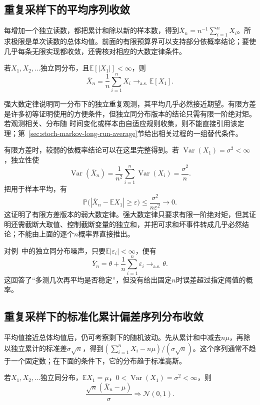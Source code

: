 \subsection{重复采样下的平均序列收敛}

每增加一个独立读数，都把累计和除以新的样本数，得到\(\overline X_n=n^{-1}\sum_{i=1}^nX_i\)。所求极限是单次读数的总体均值。前面的有限预算界可以支持部分依概率结论；要使几乎每条无限实现都收敛，还需核对相应的大数定律条件。
\label{sec:rv-aggregate-limits}
\begin{theorem}[强大数定律]
\label{thm:probability-strong-law-large-numbers}
若\(X_1,X_2,\ldots\)独立同分布，且\(\mathbb{E}[|X_1|]<\infty\)，则
\[ \overline{X}_n
  =\frac{1}{n}\sum_{i=1}^{n}X_i\to_{\mathrm{a.s.}}\mathbb{E}[X_1]. \]
\end{theorem}

强大数定律说明同一分布下的独立重复观测，其平均几乎必然接近期望。有限方差是许多初等证明使用的方便条件，但独立同分布版本的结论只需有限一阶绝对矩。若观测相关、分布随
时间变化或样本由自适应规则收集，则不能直接引用该定理；第~\ref{sec:stoch-markov-long-run-average}节给出相关过程的一组替代条件。

有限方差时，较弱的依概率结论可以在这里完整得到。若
\(\operatorname{Var}(X_1)=\sigma^2<\infty\)，独立性使
\[
  \operatorname{Var}(\overline{X}_n)
  =\frac{1}{n^2}\sum_{i=1}^{n}\operatorname{Var}(X_i)
  =\frac{\sigma^2}{n}.
\]
把用于样本平均，有
\[
  \mathbb{P}\bigl(
    |\overline{X}_n-\mathbb{E}X_1|\geq\varepsilon
  \bigr)
  \leq\frac{\sigma^2}{n\varepsilon^2}\to0.
\]
这证明了有限方差版本的弱大数定律。强大数定律只要求有限一阶绝对矩，但其证明还需截断大取值、控制截断变量的独立和，并把可求和坏事件转成几乎必然结论；不能由上面的逐个\(n\)概率界直接推出。

对例~中的独立同分布噪声，只要\(\mathbb{E}|\varepsilon_i|<\infty\)，便有
\[ \overline{Y}_n
  =\theta+\frac{1}{n}\sum_{i=1}^{n}\varepsilon_i\to_{\mathrm{a.s.}}\theta. \]
这回答了“多测几次再平均是否稳定”，但没有给出固定\(n\)时误差超过指定阈值的概率。

\subsection{重复采样下的标准化累计偏差序列分布收敛}

平均值接近总体均值后，仍可考察剩下的随机波动。先从累计和中减去\(n\mu\)，再除以独立累计的标准差\(\sigma\sqrt n\)，得到\((\sum_{i=1}^nX_i-n\mu)/(\sigma\sqrt n)\)。这个序列通常不趋于一个固定数；在下面的条件下，它的分布趋于标准高斯。
\label{sec:rv-standardized-sum-limits}
\begin{theorem}
\label{thm:probability-iid-central-limit}
若\(X_1,X_2,\ldots\)独立同分布，\(\mathbb{E}X_1=\mu\)，\(0<\operatorname{Var}(X_1)=\sigma^2<\infty\)，则
\[ \frac{\sqrt{n}(\overline{X}_n-\mu)}{\sigma}
  \Rightarrow\mathcal{N}(0,1). \]
\end{theorem}

